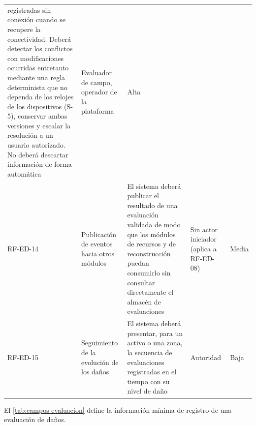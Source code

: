 \documentclass[11pt,letterpaper]{article}
\begin{document}
\begin{longtable}{L{2.0cm} L{2.9cm} L{6.0cm} L{3.0cm} L{1.2cm}}
registradas sin conexión cuando se recupere la conectividad. Deberá detectar los conflictos con
modificaciones ocurridas entretanto mediante una regla determinista que no dependa de los relojes de
los dispositivos (S-5), conservar ambas versiones y escalar la resolución a un usuario autorizado.
No deberá descartar información de forma automática & Evaluador de campo, operador de la plataforma
& Alta \\
RF-ED-14 & Publicación de eventos hacia otros módulos & El sistema deberá publicar el resultado de
una evaluación validada de modo que los módulos de recursos y de reconstrucción puedan consumirlo
sin consultar directamente el almacén de evaluaciones & Sin actor iniciador (aplica a RF-ED-08) &
Media \\
RF-ED-15 & Seguimiento de la evolución de los daños & El sistema deberá presentar, para un activo o
una zona, la secuencia de evaluaciones registradas en el tiempo con su nivel de daño & Autoridad &
Baja \\
\end{longtable}

El \cref{tab:campos-evaluacion} define la información mínima de registro de una evaluación de daños.
\end{document}
